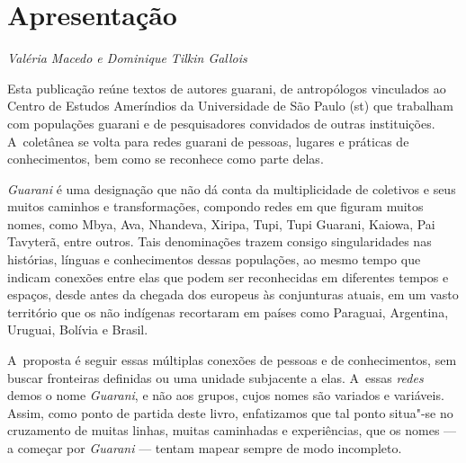 
\chapter*{Apresentação}


\begin{flushright}
\emph{Valéria Macedo e Dominique Tilkin Gallois}
\end{flushright}

\medskip
\noindent
Esta publicação reúne textos de autores guarani, de antropólogos
vinculados ao Centro de Estudos Ameríndios da Universidade de São Paulo
(st) que trabalham com populações guarani e de pesquisadores
convidados de outras instituições. A~coletânea se volta para redes
guarani de pessoas, lugares e práticas de conhecimentos, bem como se
reconhece como parte delas. 

\emph{Guarani} é uma designação que não dá conta da multiplicidade de coletivos
e seus muitos caminhos e transformações, compondo redes em que figuram
muitos nomes, como Mbya, Ava, Nhandeva, Xiripa, Tupi, Tupi Guarani,
Kaiowa, Pai Tavyterã, entre outros. Tais denominações trazem consigo
singularidades nas histórias, línguas e conhecimentos dessas
populações, ao mesmo tempo que indicam conexões entre elas que podem
ser reconhecidas em diferentes tempos e espaços, desde antes da chegada
dos europeus às conjunturas atuais, em um vasto território que os não
indígenas recortaram em países como Paraguai, Argentina, Uruguai,
Bolívia e Brasil.

A~proposta é seguir essas múltiplas conexões de pessoas e de
conhecimentos, sem buscar fronteiras definidas ou uma unidade
subjacente a elas. A~essas \emph{redes} demos o nome \emph{Guarani}, e não aos
grupos, cujos nomes são variados e variáveis. Assim, como ponto de
partida deste livro, enfatizamos que tal ponto situa"-se no cruzamento
de muitas linhas, muitas caminhadas e experiências, que os nomes --- a
começar por \emph{Guarani} --- tentam mapear sempre de modo incompleto.

